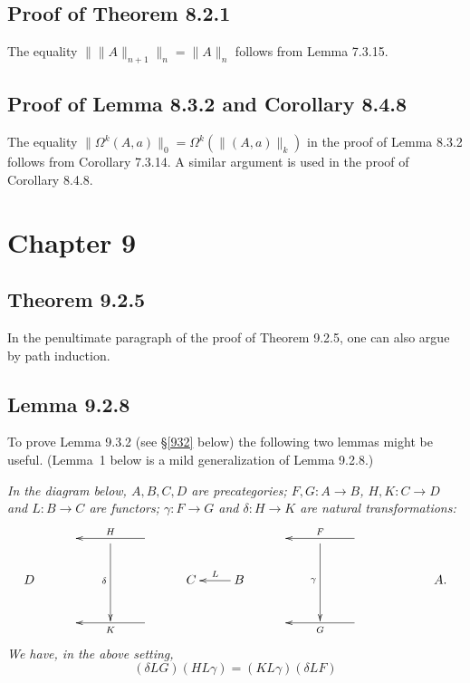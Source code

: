 \documentclass[12pt]{article}
\begin{document}



\subsection{Proof of Theorem 8.2.1}

The equality $\lVert\lVert A\rVert_{n+1}\rVert_n=\lVert A\rVert_n$ follows from Lemma 7.3.15.


\subsection{Proof of Lemma 8.3.2 and Corollary 8.4.8}

The equality $\lVert\Omega^k(A,a)\rVert_0=\Omega^k(\lVert(A,a)\rVert_k)$ in the proof of Lemma 8.3.2 follows from Corollary 7.3.14. A similar argument is used in the proof of Corollary 8.4.8.


\section{Chapter 9}

\subsection{Theorem 9.2.5}

In the penultimate paragraph of the proof of Theorem 9.2.5, one can also argue by path induction.


\subsection{Lemma 9.2.8}\label{928}

To prove Lemma 9.3.2 (see \S\ref{932} below) the following two lemmas might be useful. (Lemma~1 below is a mild generalization of Lemma 9.2.8.)

\nn{} \emph{In the diagram below, $A,B,C,D$ are precategories; $F,G:A\to B$, $H,K:C\to D$ and $L:B\to C$ are functors; $\gamma:F\to G$ and $\delta:H\to K$ are natural transformations:
$$
\xymatrix{
&&\ar[dd]_\delta&\ar[ll]_H&&&&\ar[dd]_\gamma&\ar[ll]_F\\
D&&&&C&B\ar[l]_L&&&&&A.\\
&&&\ar[ll]^K&&&&&\ar[ll]^G}
$$ 
We have, in the above setting,}
\begin{equation}\label{9281}
(\delta LG)(HL\gamma)=(KL\gamma)(\delta LF)
\end{equation}
\end{document}
